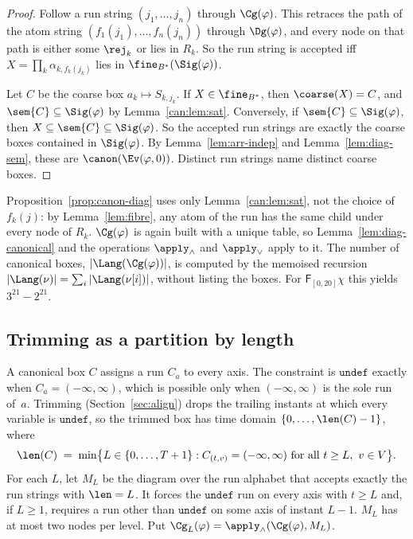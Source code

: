 \begin{proof}
Follow a run string $(j_1,\dots,j_n)$ through $\Cg(\varphi)$. This retraces the
path of the atom string $(f_1(j_1),\dots,f_n(j_n))$ through $\Dg(\varphi)$,
and every node on that path is either some $\rej_k$ or lies in $R_k$. So the
run string is accepted iff $X=\prod_k\alpha_{k,f_k(j_k)}$ lies in
$\fine_{B^*}(\Sig(\varphi))$.

Let $C$ be the coarse box $a_k\mapsto S_{k,j_k}$. If $X\in\fine_{B^*}$, then
$\coarse(X)=C$, and $\sem{C}\subseteq\Sig(\varphi)$ by Lemma~\ref{can:lem:sat}.
Conversely, if $\sem{C}\subseteq\Sig(\varphi)$, then
$X\subseteq\sem{C}\subseteq\Sig(\varphi)$. So the accepted run strings are
exactly the coarse boxes contained in $\Sig(\varphi)$. By
Lemma~\ref{lem:arr-indep} and Lemma~\ref{lem:diag-sem}, these are
$\canon(\Ev(\varphi,0))$. Distinct run strings name distinct coarse boxes.
\end{proof}

Proposition~\ref{prop:canon-diag} uses only Lemma~\ref{can:lem:sat}, not the choice
of $f_k(j)$: by Lemma~\ref{lem:fibre}, any atom of the run has the same child
under every node of $R_k$. $\Cg(\varphi)$ is again built with a unique table,
so Lemma~\ref{lem:diag-canonical} and the operations $\apply_\wedge$ and
$\apply_\vee$ apply to it. The number of canonical boxes, $|\Lang(\Cg(\varphi))|$,
is computed by the memoised recursion $|\Lang(\nu)|=\sum_i|\Lang(\nu[i])|$,
without listing the boxes. For $\mathsf{F}_{[0,20]}\chi$ this yields
$3^{21}-2^{21}$.

\subsection{Trimming as a partition by length}\label{sec:method-trim}

A canonical box $C$ assigns a run $C_a$ to every axis. The constraint is
$\mathtt{undef}$ exactly when $C_a=(-\infty,\infty)$, which is possible only
when $(-\infty,\infty)$ is the sole run of~$a$. Trimming
(Section~\ref{sec:align}) drops the trailing instants at which every
variable is $\mathtt{undef}$, so the trimmed box has time domain
$\{0,\dots,\len(C)-1\}$, where
\[
  \len(C) \;=\; \min\bigl\{L\in\{0,\dots,T+1\} : C_{(t,v)}=(-\infty,\infty)
  \text{ for all } t\ge L,\ v\in V\bigr\}.
\]
For each $L$, let $M_L$ be the diagram over the run alphabet that accepts
exactly the run strings with $\len=L$. It forces the $\mathtt{undef}$ run on
every axis with $t\ge L$ and, if $L\ge1$, requires a run other than
$\mathtt{undef}$ on some axis of instant $L-1$. $M_L$ has at most two nodes per
level. Put $\Cg_L(\varphi)=\apply_\wedge(\Cg(\varphi),M_L)$.

